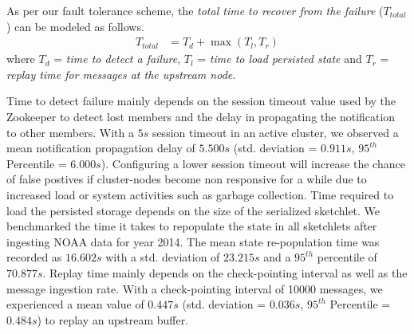 As per our fault tolerance scheme, the \textit{total time to recover from the failure} ($T_{total}$) can be modeled as follows.
\begin{align*}
    T_{total} &= T_{d} + \max{(T_{l}, T_{r})}      
\end{align*}
where $T_{d}$ = \textit{time to detect a failure}, $T_{l}$ = \textit{time to load persisted state} and $T_{r}$ = \textit{replay time for messages at the upstream node}.

Time to detect failure mainly depends on the session timeout value used by the Zookeeper to detect lost members and the delay in propagating the notification to other members. With a $5s$ session timeout in an active cluster, we observed a mean notification propagation delay of $5.500s$ (std. deviation = $0.911s$, $95^{th}$ Percentile = $6.000s$). Configuring a lower session timeout will increase the chance of false postives if cluster-nodes become non responsive for a while due to increased load or system activities such as garbage collection. Time required to load the persisted storage depends on the size of the serialized sketchlet. We benchmarked the time it takes to repopulate the state in all sketchlets after ingesting NOAA data for year 2014. The mean state re-population time was recorded as $16.602s$ with a std. deviation of $23.215s$ and a $95^{th}$ percentile of $70.877s$. Replay time mainly depends on the check-pointing interval as well as the message ingestion rate. With a check-pointing interval of 10000 messages, we experienced a mean value of $0.447s$ (std. deviation = $0.036s$, $95^{th}$ Percentile = $0.484s$) to replay an upstream buffer.  														


